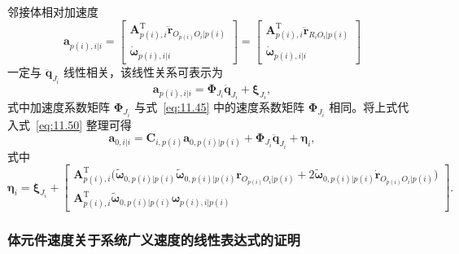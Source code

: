 邻接体相对加速度
\begin{equation}\label{eq:11.51}
\boldsymbol{a}_{p(i),i|i} = \begin{bmatrix}
\boldsymbol{A}_{p(i),i}^{\mathrm{T}} \ddot{\boldsymbol{r}}_{O_{p(i)}O_i|p(i)} \\[4pt]
\dot{\boldsymbol{\omega}}_{p(i),i|i}
\end{bmatrix}
= \begin{bmatrix}
\boldsymbol{A}_{p(i),i}^{\mathrm{T}} \ddot{\boldsymbol{r}}_{R_iO_i|p(i)} \\[4pt]
\dot{\boldsymbol{\omega}}_{p(i),i|i}
\end{bmatrix}
\end{equation}
一定与 $\ddot{\boldsymbol{q}}_{J_i}$ 线性相关，该线性关系可表示为
\begin{equation}\label{eq:11.52}
\boldsymbol{a}_{p(i),i|i} = \boldsymbol{\Phi}_{J_i} \ddot{\boldsymbol{q}}_{J_i} + \boldsymbol{\xi}_{J_i},
\end{equation}
式中加速度系数矩阵 $\boldsymbol{\Phi}_{J_i}$ 与式~\eqref{eq:11.45} 中的速度系数矩阵 $\boldsymbol{\Phi}_{J_i}$ 相同。将上式代入式~\eqref{eq:11.50} 整理可得
\begin{equation}\label{eq:11.53}
\boldsymbol{a}_{0,i|i} = \boldsymbol{C}_{i,p(i)} \boldsymbol{a}_{0,p(i)|p(i)} + \boldsymbol{\Phi}_{J_i} \ddot{\boldsymbol{q}}_{J_i} + \boldsymbol{\eta}_i,
\end{equation}
式中
\begin{equation}\label{eq:11.54}
\boldsymbol{\eta}_i = \boldsymbol{\xi}_{J_i} + \begin{bmatrix}
\boldsymbol{A}_{p(i),i}^{\mathrm{T}} \bigl( \tilde{\boldsymbol{\omega}}_{0,p(i)|p(i)} \tilde{\boldsymbol{\omega}}_{0,p(i)|p(i)} \boldsymbol{r}_{O_{p(i)}O_i|p(i)} + 2 \tilde{\boldsymbol{\omega}}_{0,p(i)|p(i)} \dot{\boldsymbol{r}}_{O_{p(i)}O_i|p(i)} \bigr) \\[6pt]
\boldsymbol{A}_{p(i),i}^{\mathrm{T}} \tilde{\boldsymbol{\omega}}_{0,p(i)|p(i)} \boldsymbol{\omega}_{p(i),i|p(i)}
\end{bmatrix}.
\end{equation}

\subsubsection{体元件速度关于系统广义速度的线性表达式的证明}

